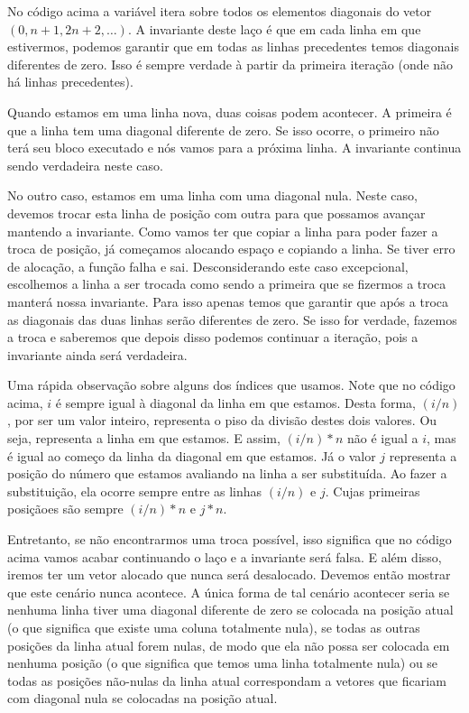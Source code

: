 No código acima a variável  itera sobre todos os
elementos diagonais do vetor $(0, n+1, 2n+2, \ldots)$. A invariante
deste laço é que em cada linha em que estivermos, podemos garantir que
em todas as linhas precedentes temos diagonais diferentes de
zero. Isso é sempre verdade à partir da primeira iteração (onde não há
linhas precedentes).

Quando estamos em uma linha nova, duas coisas podem acontecer. A
primeira é que a linha tem uma diagonal diferente de zero. Se isso
ocorre, o primeiro  não terá seu bloco executado e nós
vamos para a próxima linha. A invariante continua sendo verdadeira
neste caso.

No outro caso, estamos em uma linha com uma diagonal nula. Neste caso,
devemos trocar esta linha de posição com outra para que possamos
avançar mantendo a invariante. Como vamos ter que copiar a linha para
poder fazer a troca de posição, já começamos alocando espaço e
copiando a linha. Se tiver erro de alocação, a função falha e
sai. Desconsiderando este caso excepcional, escolhemos a linha a ser
trocada como sendo a primeira que se fizermos a troca manterá nossa
invariante. Para isso apenas temos que garantir que após a troca as
diagonais das duas linhas serão diferentes de zero. Se isso for
verdade, fazemos a troca e saberemos que depois disso podemos
continuar a iteração, pois a invariante ainda será verdadeira.

Uma rápida observação sobre alguns dos índices que usamos. Note que no
código acima, $i$ é sempre igual à diagonal da linha em que
estamos. Desta forma, $(i/n)$, por ser um valor inteiro, representa o
piso da divisão destes dois valores. Ou seja, representa a linha em
que estamos. E assim, $(i/n)*n$ não é igual a $i$, mas é igual ao
começo da linha da diagonal em que estamos. Já o valor $j$ representa
a posição do número que estamos avaliando na linha a ser
substituída. Ao fazer a substituição, ela ocorre sempre entre as
linhas $(i/n)$ e $j$. Cujas primeiras posiçãoes são sempre $(i/n)*n$
e $j*n$.

Entretanto, se não encontrarmos uma troca possível, isso significa que
no código acima vamos acabar continuando o laço e a invariante será
falsa. E além disso, iremos ter um vetor alocado que nunca será
desalocado. Devemos então mostrar que este cenário nunca acontece. A
única forma de tal cenário acontecer seria se nenhuma linha tiver uma
diagonal diferente de zero se colocada na posição atual (o que
significa que existe uma coluna totalmente nula), se todas as outras
posições da linha atual forem nulas, de modo que ela não possa ser
colocada em nenhuma posição (o que significa que temos uma linha
totalmente nula) ou se todas as posições não-nulas da linha atual
correspondam a vetores que ficariam com diagonal nula se colocadas na
posição atual.

\fim


